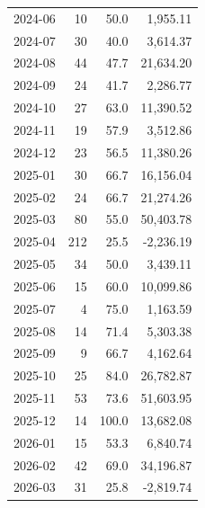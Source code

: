 \documentclass[11pt,a4paper,twoside]{article}
\begin{document}
\begin{center}
\begin{tabular}{>{\color{txtmain}}l rrr}
2024-06 & 10 & 50.0 & \textcolor{wingreen}{1,955.11} \\
2024-07 & 30 & 40.0 & \textcolor{wingreen}{3,614.37} \\
2024-08 & 44 & 47.7 & \textcolor{wingreen}{21,634.20} \\
2024-09 & 24 & 41.7 & \textcolor{wingreen}{2,286.77} \\
2024-10 & 27 & 63.0 & \textcolor{wingreen}{11,390.52} \\
2024-11 & 19 & 57.9 & \textcolor{wingreen}{3,512.86} \\
2024-12 & 23 & 56.5 & \textcolor{wingreen}{11,380.26} \\
2025-01 & 30 & 66.7 & \textcolor{wingreen}{16,156.04} \\
2025-02 & 24 & 66.7 & \textcolor{wingreen}{21,274.26} \\
2025-03 & 80 & 55.0 & \textcolor{wingreen}{50,403.78} \\
2025-04 & 212 & 25.5 & \textcolor{lossred}{-2,236.19} \\
2025-05 & 34 & 50.0 & \textcolor{wingreen}{3,439.11} \\
2025-06 & 15 & 60.0 & \textcolor{wingreen}{10,099.86} \\
2025-07 & 4 & 75.0 & \textcolor{wingreen}{1,163.59} \\
2025-08 & 14 & 71.4 & \textcolor{wingreen}{5,303.38} \\
2025-09 & 9 & 66.7 & \textcolor{wingreen}{4,162.64} \\
2025-10 & 25 & 84.0 & \textcolor{wingreen}{26,782.87} \\
2025-11 & 53 & 73.6 & \textcolor{wingreen}{51,603.95} \\
2025-12 & 14 & 100.0 & \textcolor{wingreen}{13,682.08} \\
2026-01 & 15 & 53.3 & \textcolor{wingreen}{6,840.74} \\
2026-02 & 42 & 69.0 & \textcolor{wingreen}{34,196.87} \\
2026-03 & 31 & 25.8 & \textcolor{lossred}{-2,819.74} \\
\bottomrule
\end{tabular}
\end{center}
\end{document}
